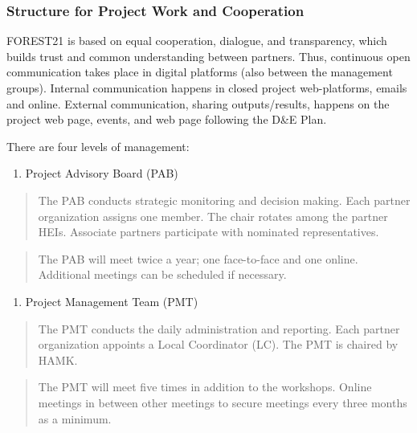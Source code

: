 \documentclass[
  11pt,
]{article}
\providecommand{\tightlist}{%
  \setlength{\itemsep}{0pt}\setlength{\parskip}{0pt}}
\begin{document}
\hypertarget{structure-for-project-work-and-cooperation}{%
\subsubsection{Structure for Project Work and
Cooperation}\label{structure-for-project-work-and-cooperation}}

FOREST21 is based on equal cooperation, dialogue, and transparency,
which builds trust and common understanding between partners. Thus,
continuous open communication takes place in digital platforms (also
between the management groups). Internal communication happens in closed
project web-platforms, emails and online. External communication,
sharing outputs/results, happens on the project web page, events, and
web page following the D\&E Plan.

There are four levels of management:

\begin{enumerate}
\def\labelenumi{\arabic{enumi}.}
\tightlist
\item
  Project Advisory Board (PAB)
\end{enumerate}

\begin{quote}
The PAB conducts strategic monitoring and decision making. Each partner
organization assigns one member. The chair rotates among the partner
HEIs. Associate partners participate with nominated representatives.
\end{quote}

\begin{quote}
The PAB will meet twice a year; one face-to-face and one online.
Additional meetings can be scheduled if necessary.
\end{quote}

\begin{enumerate}
\def\labelenumi{\arabic{enumi}.}
\setcounter{enumi}{1}
\tightlist
\item
  Project Management Team (PMT)
\end{enumerate}

\begin{quote}
The PMT conducts the daily administration and reporting. Each partner
organization appoints a Local Coordinator (LC). The PMT is chaired by
HAMK.
\end{quote}

\begin{quote}
The PMT will meet five times in addition to the workshops. Online
meetings in between other meetings to secure meetings every three months
as a minimum.
\end{quote}
\end{document}

